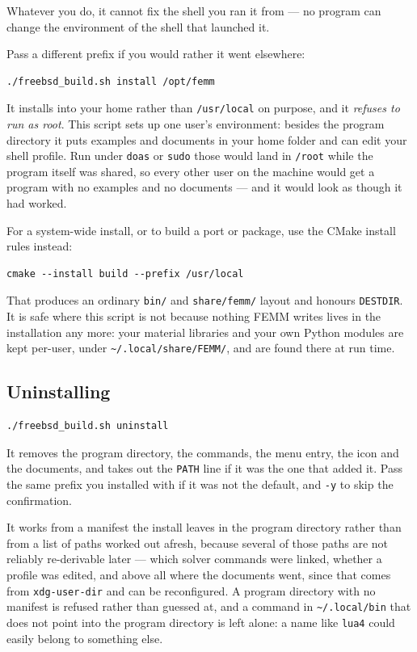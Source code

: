 \documentclass[11pt]{article}
\begin{document}
Whatever you do, it cannot fix the shell you ran it from --- no program can
change the environment of the shell that launched it.

Pass a different prefix if you would rather it went elsewhere:
\begin{lstlisting}
./freebsd_build.sh install /opt/femm
\end{lstlisting}

It installs into your home rather than \texttt{/usr/local} on purpose,
and it \emph{refuses to run as root}.  This script sets up one user's
environment: besides the program directory it puts examples and documents
in your home folder and can edit your shell profile.  Run under
\texttt{doas} or \texttt{sudo} those would land in \texttt{/root} while
the program itself was shared, so every other user on the machine would
get a program with no examples and no documents --- and it would look as
though it had worked.

For a system-wide install, or to build a port or package, use the CMake
install rules instead:
\begin{lstlisting}
cmake --install build --prefix /usr/local
\end{lstlisting}

\noindent That produces an ordinary \texttt{bin/} and
\texttt{share/femm/} layout and honours \texttt{DESTDIR}.  It is safe
where this script is not because nothing FEMM writes lives in the
installation any more: your material libraries and your own Python
modules are kept per-user, under
\texttt{\textasciitilde/.local/share/FEMM/}, and are found there at run
time.

\subsection*{Uninstalling}

\begin{lstlisting}
./freebsd_build.sh uninstall
\end{lstlisting}

It removes the program directory, the commands, the menu entry, the icon
and the documents, and takes out the \texttt{PATH} line if it was the one
that added it.  Pass the same prefix you installed with if it was not the
default, and \texttt{-y} to skip the confirmation.

It works from a manifest the install leaves in the program directory
rather than from a list of paths worked out afresh, because several of
those paths are not reliably re-derivable later --- which solver
commands were linked, whether a profile was edited, and above all where
the documents went, since that comes from \texttt{xdg-user-dir} and can
be reconfigured.  A program directory with no manifest is refused rather
than guessed at, and a command in \texttt{\textasciitilde/.local/bin}
that does not point into the program directory is left alone: a name
like \texttt{lua4} could easily belong to something else.
\end{document}
